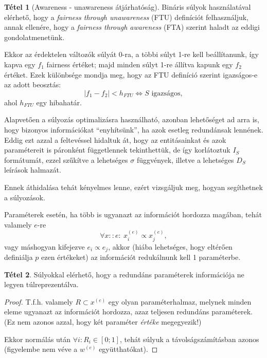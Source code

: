 \documentclass{article}
\theoremstyle{definition}
\newtheorem{theorem}{Tétel}[section]
\newcommand{\ent}[2]{ {#1}^{(#2)} }
\begin{document}
\begin{multicols}{2}
    \begin{theorem}[Awareness - unawareness átjárhatóság]
        Bináris súlyok használatával elérhető, hogy a \textit{fairness through unawareness} (FTU) definíciót felhasználjuk, annak ellenére, hogy a \textit{fairness through awareness} (FTA) szerint haladt az eddigi gondolatmenetünk. 
        
        Ekkor az érdektelen változók súlyát 0-ra, a többi súlyt 1-re kell beállítanunk, így kapva egy $f_1$ fairness értéket; majd minden súlyt 1-re állítva kapunk egy $f_2$ értéket. Ezek különbsége mondja meg, hogy az FTU definíció szerint igazságos-e az adott beosztás:
        $$ |f_1 - f_2| < h_{FTU} \Leftrightarrow S \text{ igazságos}, $$
        ahol $h_{FTU}$ egy hibahatár.
    \end{theorem}
    
    Alapvetően a súlyozás optimalizásra használható, azonban lehetőséget ad arra is, hogy bizonyos információkat \enquote{enyhítsünk}, ha azok esetleg redundánsak lennének. Eddig ezt azzal a feltevéssel hidaltuk át, hogy az entitásainkat és azok paramétereit is páronként függetlennek tekinthettük, de így korlátoztuk $I_S$ formátumát, ezzel szűkítve a lehetséges $\sigma$ függvények, illetve a lehetséges $D_S$ leírások halmazát.
    
    Ennek áthidalása tehát kényelmes lenne, ezért vizsgáljuk meg, hogyan segíthetnek a súlyozások.

    Paraméterek esetén, ha több is ugyanazt az információt hordozza magában, tehát valamely $e$-re $$\forall x::e : \ \ent x e _i \propto \ent x e _j,$$ vagy máshogyan kifejezve $e_i \propto e_j$, akkor (hiába lehetséges, hogy eltérően definiálja $p$ ezen értékeket) az információt redukálnunk kell 1 paraméterbe.

    \begin{theorem}
        Súlyokkal elérhető, hogy a redundáns paraméterek információja ne legyen túlreprezentálva.
        
        \begin{proof}
            T.f.h. valamely $R \subset \ent x e$ egy olyan paraméterhalmaz, melynek minden eleme ugyanazt az információt hordozza, azaz teljesen redundáns paraméterek. (Ez nem azonos azzal, hogy két paraméter \textit{értéke} megegyezik!)
            
            Ekkor normálás után $\forall i: R_i \in [0;1]$, tehát súlyuk a távolságszámításban azonos (figyelembe nem véve a $\ent w e$ együtthatókat). 
            

\end{proof}
\end{theorem}
\end{multicols}
\end{document}
